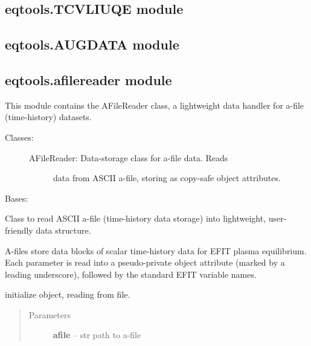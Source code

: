 \documentclass[letterpaper,10pt,english]{sphinxmanual}
\begin{document}
\subsection{eqtools.TCVLIUQE module}
\label{eqtools:eqtools-tcvliuqe-module}

\subsection{eqtools.AUGDATA module}
\label{eqtools:eqtools-augdata-module}

\subsection{eqtools.afilereader module}
\label{eqtools:eqtools-afilereader-module}\label{eqtools:module-eqtools.afilereader}
This module contains the AFileReader class, a lightweight data
handler for a-file (time-history) datasets.
\begin{description}
\item[{Classes:}] \leavevmode\begin{description}
\item[{AFileReader: Data-storage class for a-file data.  Reads}] \leavevmode
data from ASCII a-file, storing as copy-safe object
attributes.

\end{description}

\end{description}

\begin{fulllineitems}
\label{eqtools:eqtools.afilereader.AFileReader}
Bases: 

Class to read ASCII a-file (time-history data storage) into lightweight, user-friendly data structure.

A-files store data blocks of scalar time-history data for EFIT plasma equilibrium.  Each parameter is
read into a pseudo-private object attribute (marked by a leading underscore), followed by the standard
EFIT variable names.

initialize object, reading from file.
\begin{quote}\begin{description}
\item[{Parameters}] \leavevmode
\textbf{afile} -- str
path to a-file

\end{description}\end{quote}

\end{fulllineitems}
\end{document}
